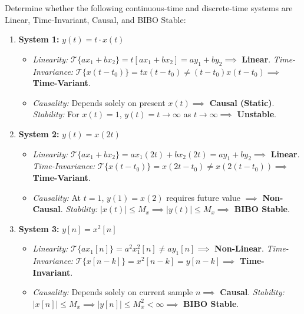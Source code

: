 \documentclass[12pt,a4paper]{article}
\begin{document}
\begin{tcolorbox}[examplebox, title={\textbf{Diagnostic Example: Verification of System Properties}}]
Determine whether the following continuous-time and discrete-time systems are Linear, Time-Invariant, Causal, and BIBO Stable:
\begin{enumerate}[label=(\roman*), leftmargin=*, itemsep=3pt]
  \item \textbf{System 1:} $y(t) = t \cdot x(t)$
  \begin{itemize}[itemsep=1pt]
    \item \textit{Linearity:} $\mathcal{T}\{a x_1 + b x_2\} = t [a x_1 + b x_2] = a y_1 + b y_2 \implies$ \textbf{Linear}. \quad \textit{Time-Invariance:} $\mathcal{T}\{x(t - t_0)\} = t x(t - t_0) \neq (t - t_0)x(t - t_0) \implies$ \textbf{Time-Variant}.
    \item \textit{Causality:} Depends solely on present $x(t) \implies$ \textbf{Causal (Static)}. \quad \textit{Stability:} For $x(t) = 1$, $y(t) = t \to \infty$ as $t \to \infty \implies$ \textbf{Unstable}.
  \end{itemize}
  \item \textbf{System 2:} $y(t) = x(2t)$
  \begin{itemize}[itemsep=1pt]
    \item \textit{Linearity:} $\mathcal{T}\{a x_1 + b x_2\} = a x_1(2t) + b x_2(2t) = a y_1 + b y_2 \implies$ \textbf{Linear}. \quad \textit{Time-Invariance:} $\mathcal{T}\{x(t - t_0)\} = x(2t - t_0) \neq x(2(t - t_0)) \implies$ \textbf{Time-Variant}.
    \item \textit{Causality:} At $t = 1$, $y(1) = x(2)$ requires future value $\implies$ \textbf{Non-Causal}. \quad \textit{Stability:} $|x(t)| \le M_x \implies |y(t)| \le M_x \implies$ \textbf{BIBO Stable}.
  \end{itemize}
  \item \textbf{System 3:} $y[n] = x^2[n]$
  \begin{itemize}[itemsep=1pt]
    \item \textit{Linearity:} $\mathcal{T}\{a x_1[n]\} = a^2 x_1^2[n] \neq a y_1[n] \implies$ \textbf{Non-Linear}. \quad \textit{Time-Invariance:} $\mathcal{T}\{x[n - k]\} = x^2[n - k] = y[n - k] \implies$ \textbf{Time-Invariant}.
    \item \textit{Causality:} Depends solely on current sample $n \implies$ \textbf{Causal}. \quad \textit{Stability:} $|x[n]| \le M_x \implies |y[n]| \le M_x^2 < \infty \implies$ \textbf{BIBO Stable}.
  \end{itemize}
\end{enumerate}
\end{tcolorbox}
\end{document}
